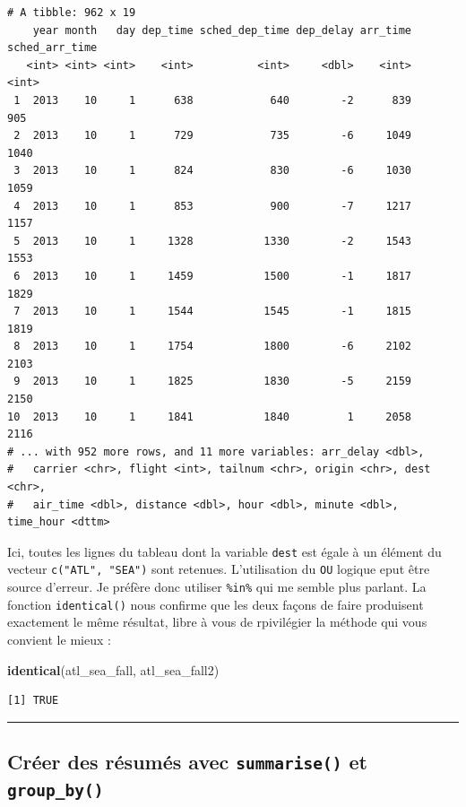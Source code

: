 \documentclass[a4paperpaper,]{article}
\newenvironment{Shaded}{\begin{snugshade}}{\end{snugshade}}
\newcommand{\KeywordTok}[1]{\textcolor[rgb]{0.13,0.29,0.53}{\textbf{#1}}}
\newcommand{\NormalTok}[1]{#1}
\theoremstyle{definition}
\theoremstyle{definition}
\theoremstyle{definition}
\theoremstyle{remark}
\begin{document}
\begin{verbatim}
# A tibble: 962 x 19
    year month   day dep_time sched_dep_time dep_delay arr_time sched_arr_time
   <int> <int> <int>    <int>          <int>     <dbl>    <int>          <int>
 1  2013    10     1      638            640        -2      839            905
 2  2013    10     1      729            735        -6     1049           1040
 3  2013    10     1      824            830        -6     1030           1059
 4  2013    10     1      853            900        -7     1217           1157
 5  2013    10     1     1328           1330        -2     1543           1553
 6  2013    10     1     1459           1500        -1     1817           1829
 7  2013    10     1     1544           1545        -1     1815           1819
 8  2013    10     1     1754           1800        -6     2102           2103
 9  2013    10     1     1825           1830        -5     2159           2150
10  2013    10     1     1841           1840         1     2058           2116
# ... with 952 more rows, and 11 more variables: arr_delay <dbl>,
#   carrier <chr>, flight <int>, tailnum <chr>, origin <chr>, dest <chr>,
#   air_time <dbl>, distance <dbl>, hour <dbl>, minute <dbl>, time_hour <dttm>
\end{verbatim}

Ici, toutes les lignes du tableau dont la variable \texttt{dest} est
égale à un élément du vecteur \texttt{c("ATL",\ "SEA")} sont retenues.
L'utilisation du \texttt{OU} logique eput être source d'erreur. Je
préfère donc utiliser \texttt{\%in\%} qui me semble plus parlant. La
fonction \texttt{identical()} nous confirme que les deux façons de faire
produisent exactement le même résultat, libre à vous de rpivilégier la
méthode qui vous convient le mieux :

\begin{Shaded}
\begin{Highlighting}[]
\KeywordTok{identical}\NormalTok{(atl_sea_fall, atl_sea_fall2)}
\end{Highlighting}
\end{Shaded}

\begin{verbatim}
[1] TRUE
\end{verbatim}

\begin{center}\rule{0.5\linewidth}{\linethickness}\end{center}

\subsection{\texorpdfstring{Créer des résumés avec \texttt{summarise()}
et
\texttt{group\_by()}}{Créer des résumés avec summarise() et group\_by()}}\label{creer-des-resumes-avec-summarise-et-group_by}
\end{document}
